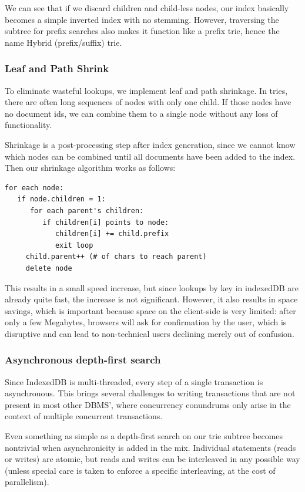 \documentclass{vldb}
\begin{document}
We can see that if we discard children and child-less nodes, our index basically becomes a simple inverted index with no stemming. However, traversing the subtree for prefix searches also makes it function like a prefix trie, hence the name Hybrid (prefix/suffix) trie.

\subsubsection{Leaf and Path Shrink}

To eliminate wasteful lookups, we implement leaf and path shrinkage. In tries, there are often long sequences of nodes with only one child. If those nodes have no document ids, we can combine them to a single node without any loss of functionality.

Shrinkage is a post-processing step after index generation, since we cannot know which nodes can be combined until all documents have been added to the index. Then our shrinkage algorithm works as follows:

\begin{verbatim}
for each node: 
   if node.children = 1:
      for each parent's children:
         if children[i] points to node:
     	    children[i] += child.prefix
     	    exit loop
     child.parent++ (# of chars to reach parent)
     delete node
\end{verbatim}

This results in a small speed increase, but since lookups by key in indexedDB are already quite fast, the increase is not significant. However, it also results in space savings, which is important because space on the client-side is very limited: after only a few Megabytes, browsers will ask for confirmation by the user, which is disruptive and can lead to non-technical users declining merely out of confusion.

\subsubsection{Asynchronous depth-first search}

Since IndexedDB is multi-threaded, every step of a single transaction is asynchronous. This brings several challenges to writing transactions that are not present in most other DBMS', where concurrency conundrums only arise in the context of multiple concurrent transactions.

Even something as simple as a depth-first search on our trie subtree becomes nontrivial when asynchronicity is added in the mix. Individual statements (reads or writes) are atomic, but reads and writes can be interleaved in any possible way (unless special care is taken to enforce a specific interleaving, at the cost of parallelism).
\end{document}
